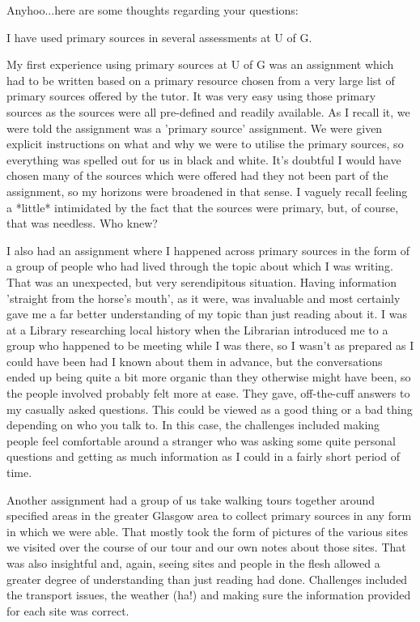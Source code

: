 \documentclass{l4proj}
\begin{document}
\begin{appendices}
Anyhoo...here are some thoughts regarding your questions:

I have used primary sources in several assessments at U of G.

My first experience using primary sources at U of G was an assignment which had to be written based on a primary resource chosen from a very large list of primary sources offered by the tutor. It was very easy using those primary sources as the sources were all pre-defined and readily available. As I recall it, we were told the assignment was a 'primary source' assignment. We were given explicit instructions on what and why we were to utilise the primary sources, so everything was spelled out for us in black and white. It's doubtful I would have chosen many of the sources which were offered had they not been part of the assignment, so my horizons were broadened in that sense. I vaguely recall feeling a *little* intimidated by the fact that the sources were primary, but, of course, that was needless. Who knew?

I also had an assignment where I happened across primary sources in the form of a group of people who had lived through the topic about which I was writing. That was an unexpected, but very serendipitous situation. Having information 'straight from the horse's mouth', as it were, was invaluable and most certainly gave me a far better understanding of my topic than just reading about it. I was at a Library researching local history when the Librarian introduced me to a group who happened to be meeting while I was there, so I wasn't as prepared as I could have been had I known about them in advance, but the conversations ended up being quite a bit more organic than they otherwise might have been, so the people involved probably felt more at ease. They gave, off-the-cuff answers to my casually asked questions. This could be viewed as a good thing or a bad thing depending on who you talk to. In this case, the challenges included making people feel comfortable around a stranger who was asking some quite personal questions and getting as much information as I could in a fairly short period of time.

Another assignment had a group of us take walking tours together around specified areas in the greater Glasgow area to collect primary sources in any form in which we were able. That mostly took the form of pictures of the various sites we visited over the course of our tour and our own notes about those sites. That was also insightful and, again, seeing sites and people in the flesh allowed a greater degree of understanding than just reading had done. Challenges included the transport issues, the weather (ha!) and making sure the information provided for each site was correct.


\end{appendices}
\end{document}
